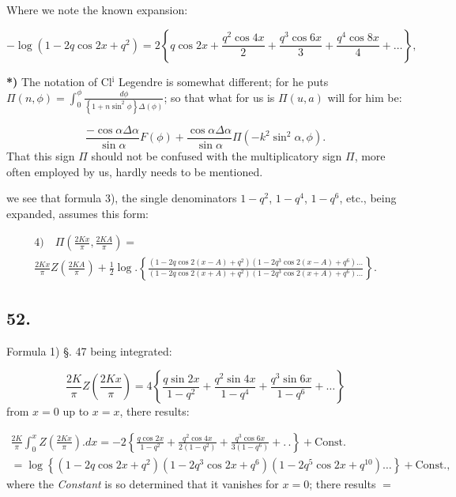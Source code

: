 \documentclass{article}
\begin{document}
Where we note the known expansion:

\[
-\log(1-2q\cos2x+q^{2})=2\left\{q\cos2x+\frac{q^{2}\cos4x}{2}+\frac{q^{3}\cos6x}{3}+\frac{q^{4}\cos8x}{4}+\ldots\right\},
\]

\textbf{*)} The notation of Cl$^{\mathrm{i}}$ Legendre is somewhat different; for he puts $\Pi(n,\phi)=\displaystyle\int_{0}^{\phi}\frac{d\phi}{\left\{1+n\sin^{2}\phi\right\}\Delta(\phi)}$; so that what for us is $\Pi(u,a)$ will for him be:

\[
\frac{-\cos\alpha\Delta\alpha}{\sin\alpha}F(\phi)+\frac{\cos\alpha\Delta\alpha}{\sin\alpha}\Pi(-k^{2}\sin^{2}\alpha,\phi).
\]
That this sign $\Pi$ should not be confused with the multiplicatory sign $\Pi$, more often employed by us, hardly needs to be mentioned.

we see that formula 3), the single denominators $1-q^{2}$, $1-q^{4}$, $1-q^{6}$, etc., being expanded, assumes this form:

\[
\begin{gathered}
\text{4)}\quad \Pi\left(\frac{2Kx}{\pi},\frac{2KA}{\pi}\right)=\\[1.5ex]
\frac{2Kx}{\pi}Z\left(\frac{2KA}{\pi}\right)+\frac{1}{2}\log.\left\{\frac{\left(1-2q\cos2(x-A)+q^{2}\right)\left(1-2q^{3}\cos2(x-A)+q^{6}\right)\ldots}{\left(1-2q\cos2(x+A)+q^{2}\right)\left(1-2q^{3}\cos2(x+A)+q^{6}\right)\ldots}\right\}.
\end{gathered}
\]

\subsection*{52.}

Formula 1) §. 47 being integrated:

\[
\frac{2K}{\pi}Z\left(\frac{2Kx}{\pi}\right)=4\left\{\frac{q\sin2x}{1-q^{2}}+\frac{q^{2}\sin4x}{1-q^{4}}+\frac{q^{3}\sin6x}{1-q^{6}}+\ldots\right\}
\]
from $x=0$ up to $x=x$, there results:

\[
\begin{gathered}
\frac{2K}{\pi}\int_{0}^{x}Z\left(\frac{2Kx}{\pi}\right).dx=-2\left\{\frac{q\cos2x}{1-q^{2}}+\frac{q^{2}\cos4x}{2(1-q^{2})}+\frac{q^{3}\cos6x}{3(1-q^{6})}+.\,.\right\}+\text{Const.}\\[1.5ex]
=\log\left\{(1-2q\cos2x+q^{2})(1-2q^{3}\cos2x+q^{6})(1-2q^{5}\cos2x+q^{10})\ldots\right\}+\text{Const.},
\end{gathered}
\]
where the \emph{Constant} is so determined that it vanishes for $x=0$; there results $=$
\end{document}
